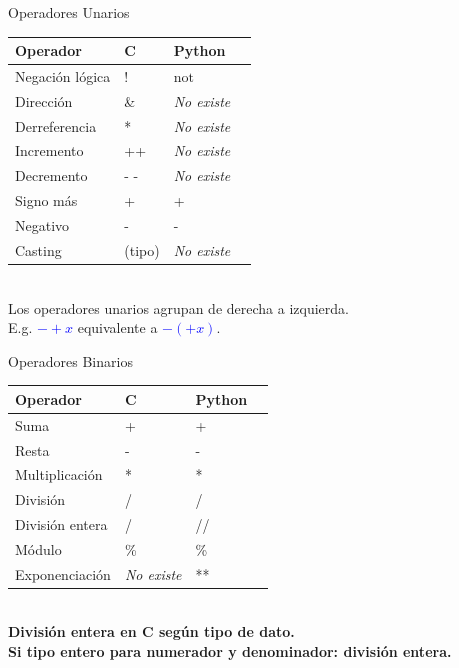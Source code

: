 \documentclass{beamer}
\begin{document}
\begin{frame}[fragile]{Operadores Unarios}
\begin{tabular}{|l|l|l|l|}\hline \hline
	\textbf{Operador} &\textbf{C} & \textbf{Python}   \\ \hline \hline
	Negación lógica & !  &  $\mbox{not}$ \\  \hline
	Dirección       & \&  &  \emph{No existe} \\  \hline
	Derreferencia   & * &  \emph{No existe} \\  \hline
	Incremento      & ++ &  \emph{No existe} \\  \hline
	Decremento      & - - & \emph{No existe} \\  \hline
	Signo más       & + &  + \\  \hline
	Negativo        & - &  - \\  \hline
	Casting         & (tipo) &  \emph{No existe} \\  \hline
\end{tabular}\\[1em]
Los operadores unarios agrupan de derecha a izquierda. \\ E.g. \textcolor{blue}{$-+ x$} equivalente a \textcolor{blue}{$-(+ x)$}.
\end{frame}

\begin{frame}[fragile]{Operadores Binarios}
\begin{tabular}{|l|l|l|l|}\hline \hline
	\textbf{Operador} &\textbf{C} & \textbf{Python}   \\ \hline \hline
	Suma         & +  & +  \\  \hline
	Resta       & - &  - \\  \hline
	Multiplicación & * & *  \\  \hline
	División      & / &  / \\  \hline
	División entera & /  & //  \\  \hline
	Módulo      & \% & \% \\  \hline
	Exponenciación   & \emph{No existe}  &  ** \\  \hline
\end{tabular}\\[1em]
\footnotesize
\textbf{División entera en C según tipo de dato.}\\
\textbf{Si tipo entero para numerador y denominador: división entera.}
\end{frame}
\end{document}
